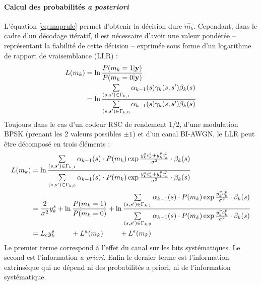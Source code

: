 \paragraph*{Calcul des probabilités \textit{a posteriori}} L'équation \ref{eq:maprule} permet d'obtenir la décision dure 
$\hat{m_k}$. Cependant, dans le cadre d'un décodage itératif, il est nécessaire d'avoir une valeur pondérée -- représentant 
la fiabilité de cette décision -- exprimée sous forme d'un logarithme de rapport de vraisemblance (LLR) : 
\begin{align}
	L(m_k) & = \ln\frac{P(m_k=1|\mathbf{y})}{P(m_k=0|\mathbf{y})}                                                                                                                           \\
	       & = \ln\frac{\sum\limits_{(s,s')\in\Gamma_{k,1}} \alpha_{k-1}(s) \gamma_k(s,s') \beta_k(s)}{\sum\limits_{(s,s')\in\Gamma_{k,0}}\alpha_{k-1}(s) \gamma_k(s,s') \beta_k(s)} \notag 
\end{align}
Toujours dans le cas d'un codeur RSC de rendement 1/2, d'une modulation BPSK (prenant les 2 valeurs possibles $\pm1$) et 
d'un canal BI-AWGN, le LLR peut être décomposé en trois éléments :
\begin{align}
	\label{eq:app}
	L(m_k) & =  \ln\frac{\sum\limits_{(s,s')\in\Gamma_{k,1}} \alpha_{k-1}(s) \cdot P(m_k) \exp \frac{y_k^sc_k^s+y_k^pc_k^p}{\sigma^2} \cdot \beta_k(s)}{\sum\limits_{(s,s')\in\Gamma_{k,0}} \alpha_{k-1}(s)\cdot  P(m_k) \exp \frac{y_k^sc_k^s+y_k^pc_k^p}{\sigma^2} \cdot \beta_k(s)}        \notag                             \\
	       & =  \frac{2}{\sigma^2}y_k^s + \ln \frac{P(m_k=1)}{P(m_k=0)} + \ln\frac{\sum\limits_{(s,s')\in\Gamma_{k,1}} \alpha_{k-1}(s) \cdot P(m_k) \exp \frac{y_k^pc_k^p}{\sigma^2} \cdot \beta_k(s)}{\sum\limits_{(s,s')\in\Gamma_{k,0}} \alpha_{k-1}(s)\cdot  P(m_k) \exp \frac{y_k^pc_k^p}{\sigma^2} \cdot \beta_k(s)}\notag \\
	       & = L_cy_k^s\qquad~ + L^a(m_k)\qquad~ + L^e(m_k)                                                                                                                                                                                                                                                                      
\end{align}
Le premier terme correspond à l'effet du canal sur les bits systématiques. Le second est l'information \textit{a priori}. 
Enfin le dernier terme est l'information extrinsèque qui ne dépend ni des probabilités a priori, ni de l'information systématique.

